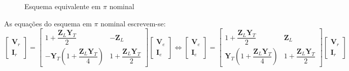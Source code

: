 \vspace{-0.5em}
\begin{figure}[H]
    \centering
    \caption{Esquema equivalente em $\pi$ nominal}
    \label{fig:linha-transmissao-esq-nominal}
\end{figure}

\vspace{-0.5em}
\noindent As equações do esquema em $\pi$ nominal escrevem-se:
$$
    \begin{bmatrix}
        \mathbf{V}_r \\[10pt]
        \mathbf{I}_r
    \end{bmatrix}
    =
    \begin{bmatrix}
        1+\dfrac{\mathbf{Z}_L\mathbf{Y}_T}{2} & -\mathbf{Z}_L \\[10pt]
        -\mathbf{Y}_T \left(1+\dfrac{\mathbf{Z}_L\mathbf{Y}_T}{4}\right) & 1+ \dfrac{\mathbf{Z}_L\mathbf{Y}_T}{2}
    \end{bmatrix}
    \begin{bmatrix}
        \mathbf{V}_e \\[10pt]
        \mathbf{I}_e
    \end{bmatrix}
    \iff
    \begin{bmatrix}
        \mathbf{V}_e \\[10pt]
        \mathbf{I}_e
    \end{bmatrix}
    =
    \begin{bmatrix}
        1+\dfrac{\mathbf{Z}_L\mathbf{Y}_T}{2} & \mathbf{Z}_L \\[10pt]
        \mathbf{Y}_T \left(1+\dfrac{\mathbf{Z}_L\mathbf{Y}_T}{4}\right) & 1+ \dfrac{\mathbf{Z}_L\mathbf{Y}_T}{2}
    \end{bmatrix}
    \begin{bmatrix}
        \mathbf{V}_r \\[10pt]
        \mathbf{I}_r
    \end{bmatrix}
$$
